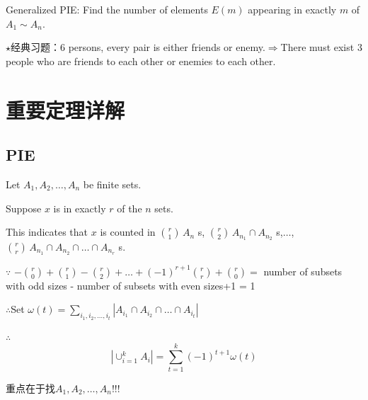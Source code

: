 \documentclass[12pt,a4paper]{ctexrep}
\begin{document}
Generalized PIE: Find the number of elements $E(m)$ appearing in exactly $m$ of $A_{1} \sim A_{n}$. 

$\star$经典习题：6 persons, every pair is either friends or enemy.$\Rightarrow$There must exist 3 people who are friends to each other or enemies to each other.
\section{重要定理详解}
\subsection{PIE}
Let $A_{1}, A_{2}, \dots , A_{n}$ be finite sets.

Suppose $x$ is in exactly $r$ of the $n$ sets.

This indicates that $x$ is counted in $\binom{r}{1} \, A_{n}$ s, $\binom{r}{2} \, A_{n_{1}}\cap A_{n_{2}}$ s,$\dots$, $\binom{r}{r} \, A_{n_{1}}\cap A_{n_{2}} \cap \dots \cap A_{n_{r}}$ s.

$\because$ $-\binom{r}{0}+\binom{r}{1}-\binom{r}{2}+\dots+(-1)^{r+1}\binom{r}{r} +\binom{r}{0}= $ number of subsets with odd sizes - number of subsets with even sizes+1 = 1

$\therefore$Set $\omega(t) = \sum_{i_{1},i_{2},\dots,i_{t}}|A_{i_{1}} \cap A_{i_{2}} \cap \dots \cap A_{i_{t}}|$

$\therefore$ \[|\cup_{i=1}^{k} A_{i}| = \sum_{t=1}^{k} (-1)^{t+1} \omega(t)\]

重点在于找$A_{1},A_{2},\dots,A_{n}$!!!\\
\end{document}
